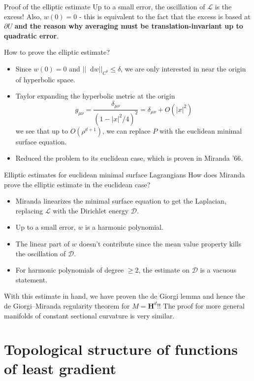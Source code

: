 \documentclass[10pt]{beamer}
\newcommand{\Hyp}{\mathbf H}
\newcommand*\dif{\mathop{}\!\mathrm{d}}
\begin{document}
\begin{frame}{Proof of the elliptic estimate}
Up to a small error, the oscillation of $\mathscr L$ is the excess! Also, $w(0) = 0$ - this is equivalent to the fact that the excess is based at $\partial U$ \textbf{and the reason why averaging must be translation-invariant up to quadratic error}.

How to prove the elliptic estimate?
\begin{itemize}
\item Since $w(0) = 0$ and $||\dif w||_{C^0} \leq \delta$, we are only interested in near the origin of hyperbolic space.
\item Taylor expanding the hyperbolic metric at the origin
$$g_{\mu\nu} = \frac{\delta_{\mu\nu}}{(1 - |x|^2/4)^2} = \delta_{\mu\nu} + O(|x|^2)$$
we see that up to $O(\rho^{d + 1})$, we can replace $P$ with the euclidean minimal surface equation.
\item Reduced the problem to its euclidean case, which is proven in Miranda '66.
\end{itemize}
\end{frame}

\begin{frame}{Elliptic estimates for euclidean minimal surface Lagrangians}
How does Miranda prove the elliptic estimate in the euclidean case?

\begin{itemize}
\item Miranda linearizes the minimal surface equation to get the Laplacian, replacing $\mathscr L$ with the Dirichlet energy $\mathscr D$.
\item Up to a small error, $w$ is a harmonic polynomial.
\item The linear part of $w$ doesn't contribute since the mean value property kills the oscillation of $\mathscr D$.
\item For harmonic polynomials of degree $\geq 2$, the estimate on $\mathscr D$ is a vacuous statement.
\end{itemize}

With this estimate in hand, we have proven the de Giorgi lemma and hence the de Giorgi--Miranda regularity theorem for $M = \Hyp^d$!!
The proof for more general manifolds of constant sectional curvature is very similar.
\end{frame}

\section{Topological structure of functions of least gradient}
\end{document}
